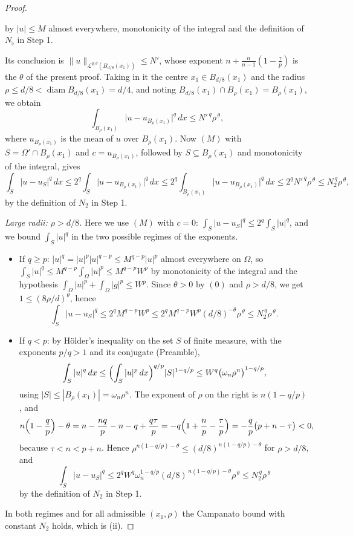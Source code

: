 \begin{proof}
\begin{itemize}
\[  \]
  by $|u|\le M$ almost everywhere, monotonicity of the integral and the
  definition of $N_\flat$ in Step 1.
\end{itemize}
Its conclusion is $\|u\|_{\mathcal L^{q,\theta}(B_{d/8}(x_1))}\le N'$, whose
exponent $n+\frac n{n-1}(1-\frac\tau p)$ is the $\theta$ of the present proof.
Taking in it the centre $x_1\in B_{d/8}(x_1)$ and the radius
$\rho\le d/8<\operatorname{diam}B_{d/8}(x_1)=d/4$, and noting
$B_{d/8}(x_1)\cap B_\rho(x_1)=B_\rho(x_1)$, we obtain
\[
\int_{B_\rho(x_1)}\bigl|u-u_{B_\rho(x_1)}\bigr|^q\,dx\le N'^{\,q}\rho^{\,\theta},
\]
where $u_{B_\rho(x_1)}$ is the mean of $u$ over $B_\rho(x_1)$.  Now $(M)$ with
$S=\Omega'\cap B_\rho(x_1)$ and $c=u_{B_\rho(x_1)}$, followed by
$S\subseteq B_\rho(x_1)$ and monotonicity of the integral, gives
\[
\int_S|u-u_S|^q\,dx\le2^q\int_S\bigl|u-u_{B_\rho(x_1)}\bigr|^q\,dx
\le2^q\int_{B_\rho(x_1)}\bigl|u-u_{B_\rho(x_1)}\bigr|^q\,dx
\le2^qN'^{\,q}\rho^{\,\theta}\le N_2^{\,q}\rho^{\,\theta},
\]
by the definition of $N_2$ in Step 1.

\emph{Large radii: $\rho>d/8$.}  Here we use $(M)$ with $c=0$:
$\int_S|u-u_S|^q\le2^q\int_S|u|^q$, and we bound $\int_S|u|^q$ in the two
possible regimes of the exponents.
\begin{itemize}
\item If $q\ge p$: $|u|^q=|u|^p|u|^{q-p}\le M^{q-p}|u|^p$ almost everywhere on
  $\Omega$, so $\int_S|u|^q\le M^{q-p}\int_\Omega|u|^p\le M^{q-p}W^p$ by
  monotonicity of the integral and the hypothesis
  $\int_\Omega|u|^p+\int_\Omega|g|^p\le W^p$.  Since $\theta>0$ by $(0)$ and
  $\rho>d/8$, we get $1\le(8\rho/d)^{\theta}$, hence
  \[
  \int_S|u-u_S|^q\le2^qM^{q-p}W^p\le2^qM^{q-p}W^p(d/8)^{-\theta}\rho^{\,\theta}
  \le N_2^{\,q}\rho^{\,\theta}.
  \]
\item If $q<p$: by H\"older's inequality on the set $S$ of finite measure, with
  the exponents $p/q>1$ and its conjugate (Preamble),
  \[
  \int_S|u|^q\,dx\le\Bigl(\int_S|u|^p\,dx\Bigr)^{q/p}|S|^{1-q/p}
  \le W^q\bigl(\omega_n\rho^n\bigr)^{1-q/p},
  \]
  using $|S|\le|B_\rho(x_1)|=\omega_n\rho^n$.  The exponent of $\rho$ on the
  right is $n(1-q/p)$, and
  \[
  n\Bigl(1-\frac qp\Bigr)-\theta
  =n-\frac{nq}p-n-q+\frac{q\tau}p
  =-q\Bigl(1+\frac{n}{p}-\frac\tau p\Bigr)
  =-\frac qp\bigl(p+n-\tau\bigr)<0 ,
  \]
  because $\tau<n<p+n$.  Hence $\rho^{n(1-q/p)-\theta}\le(d/8)^{n(1-q/p)-\theta}$
  for $\rho>d/8$, and
  \[
  \int_S|u-u_S|^q\le2^qW^q\omega_n^{1-q/p}(d/8)^{\,n(1-q/p)-\theta}\rho^{\,\theta}
  \le N_2^{\,q}\rho^{\,\theta}
  \]
  by the definition of $N_2$ in Step 1.
\end{itemize}
In both regimes and for all admissible $(x_1,\rho)$ the Campanato bound with
constant $N_2$ holds, which is (ii).


\end{proof}
